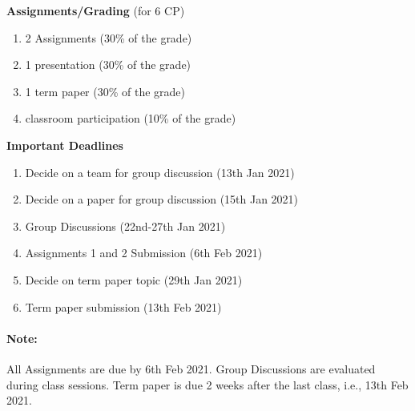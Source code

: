 \documentclass[11pt,a4paper]{article}
\begin{document}
\bigskip\textbf{\large Assignments/Grading} (for 6 CP)
\begin{enumerate}
\item 2 Assignments (30\% of the grade)
\item 1 presentation (30\% of the grade)
\item 1 term paper (30\% of the grade)
\item classroom participation (10\% of the grade)
\end{enumerate}

\bigskip\textbf{\large Important Deadlines}
\begin{enumerate}
    \item Decide on a team for group discussion (13th Jan 2021)
    \item Decide on a paper for group discussion (15th Jan 2021)
    \item Group Discussions (22nd-27th Jan 2021)
    \item Assignments 1 and 2 Submission (6th Feb 2021)
    \item Decide on term paper topic (29th Jan 2021)
    \item Term paper submission (13th Feb 2021)
    
\end{enumerate}
\paragraph{Note: } All Assignments are due by 6th Feb 2021. Group Discussions are evaluated during class sessions. Term paper is due 2 weeks after the last class, i.e., 13th Feb 2021.
\end{document}
